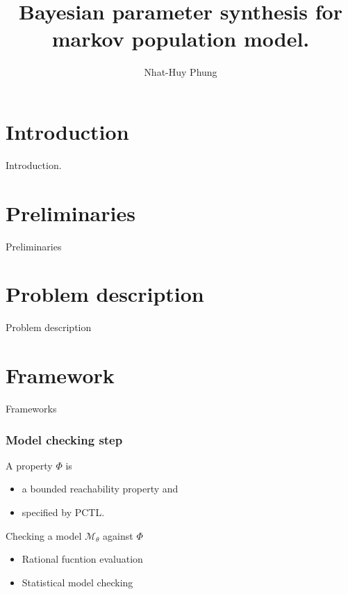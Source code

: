 \documentclass{beamer}
\title{Bayesian parameter synthesis for markov population model.}
\author{Nhat-Huy Phung}
\institute{University of Konstanz}
\begin{document}
\frame{\titlepage}
\frame{\tableofcontents}

\section{Introduction}
\begin{frame}
    \begin{center}
        \Huge Introduction.
    \end{center}
\end{frame}

\section{Preliminaries}
\begin{frame}
    \begin{center}
        \Huge Preliminaries
    \end{center}
\end{frame}

\section{Problem description}
\begin{frame}
    \begin{center}
        \Huge Problem description
    \end{center}
\end{frame}

\section{Framework}
\begin{frame}
    \begin{center}
        \Huge Frameworks
    \end{center}
\end{frame}

\begin{frame}
    \frametitle{Model checking step}
    A property $\Phi$ is
    \begin{itemize}
        \item a bounded reachability property and
        \item specified by PCTL.
    \end{itemize}
    Checking a model $\mathcal{M}_\theta$ against $\Phi$
    \begin{itemize}
        \item Rational fucntion evaluation
        \item Statistical model checking
    \end{itemize}
\end{frame}
\end{document}
